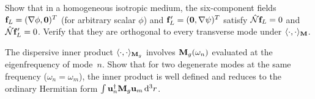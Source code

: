 \begin{exercise}
  Show that in a homogeneous isotropic medium, the six-component fields
  $\mathbf{f}_L=(\nabla\phi,\mathbf{0})^T$ (for arbitrary scalar $\phi$)
  and $\mathbf{f}_L'=(\mathbf{0},\nabla\psi)^T$ satisfy
  $\hat{\mathcal{N}}\mathbf{f}_L=0$ and $\hat{\mathcal{N}}\mathbf{f}_L'=0$.  Verify that they
  are orthogonal to every transverse mode under $\langle\cdot,\cdot\rangle_{\mathbf{M}}$.
\end{exercise}

\begin{exercise}
  The dispersive inner product $\langle\cdot,\cdot\rangle_{\mathbf{M}_g}$
  involves $\mathbf{M}_g(\omega_n)$ evaluated at the eigenfrequency of mode~$n$.
  Show that for two degenerate modes at the same frequency
  ($\omega_n=\omega_m$), the inner product is well defined and reduces to
  the ordinary Hermitian form $\int\mathbf{u}_n^\dagger\mathbf{M}_g\mathbf{u}_m\,\mathrm{d}^3r$.
\end{exercise}
